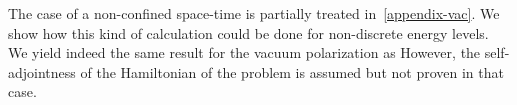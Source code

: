 \begin{remark}
The case of a non-confined space-time is partially treated in~\cref{appendix-vac}. 
We show how this kind of calculation could be done for non-discrete energy levels. 
We yield indeed the same result for the vacuum polarization as 
However, the self-adjointness of the Hamiltonian of the problem is assumed but not proven in that case.
\end{remark}












